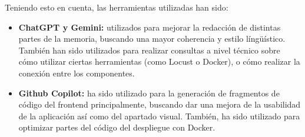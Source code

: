 Teniendo esto en cuenta, las herramientas utilizadas han sido: 

\begin{itemize}
    \item \textbf{ChatGPT y Gemini:} utilizados para mejorar la redacción de distintas partes de la memoria, buscando una mayor coherencia y estilo língüístico. También han sido
    utilizados para realizar consultas a nivel técnico sobre cómo utilizar ciertas herramientas (como Locust o Docker), o cómo realizar la conexión entre los componentes.
    
    \item \textbf{Github Copilot:} ha sido utilizado para la generación de fragmentos de código del frontend principalmente, buscando dar una mejora de la usabilidad de la aplicación
    así como del apartado visual. También, ha sido utilizado para optimizar partes del código del despliegue con Docker.
\end{itemize}